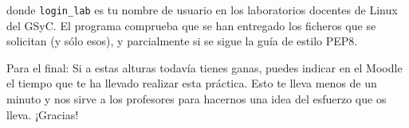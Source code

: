 \documentclass[11pt,a4paper]{article}
\begin{document}
donde \texttt{login\_lab} es tu nombre de usuario en los laboratorios docentes de Linux del GSyC. El programa comprueba que se han entregado los ficheros que se solicitan (y sólo esos), y parcialmente si se sigue la guía de estilo PEP8.

\vspace{1cm}

\footnotesize{Para el final: Si a estas alturas todavía tienes ganas, puedes indicar en el Moodle el tiempo que te ha llevado realizar esta práctica. Esto te lleva menos de un minuto y nos sirve a los profesores para hacernos una idea del esfuerzo que os lleva. ¡Gracias!}
\end{document}

